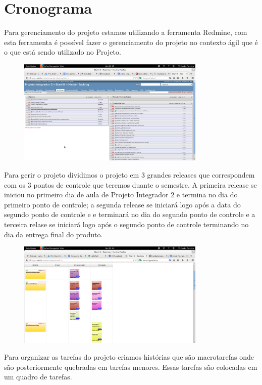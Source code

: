 \chapter[Cronograma]{Cronograma}

Para gerenciamento do projeto estamos utilizando a ferramenta Redmine, com esta ferramenta é possível fazer o gerenciamento do projeto no contexto ágil que é o que está sendo utilizado no Projeto.

\begin{figure}[h]
  \centering
  \includegraphics[width=0.8\textwidth]
      {figuras/backlogs.eps}
  \caption[redmine-backlog]
  \label{Redmine e backlog do projeto}
\end{figure}

Para gerir o projeto dividimos o projeto em 3 grandes releases que correspondem com os 3 pontos de controle que teremos duante o semestre. A primeira release se iniciou no primeiro dia de aula de Projeto Integrador 2 e termina no dia do primeiro ponto de controle; a segunda release se iniciará logo após a data do segundo ponto de controle e e terminará no dia do segundo ponto de controle e a terceira relase se iniciará logo após o segundo ponto de controle terminando no dia da entrega final do produto.

\begin{figure}[h]
  \centering
  \includegraphics[width=0.8\textwidth]
      {figuras/quadrotarefas.eps}
  \caption[quadro-de-tarefas]
  \label{Quadro de tarefas}
\end{figure}
Para organizar as tarefas do projeto criamos histórias que são macrotarefas onde são posteriormente quebradas em tarefas menores. Essas tarefas são colocadas em um quadro de tarefas.


  
